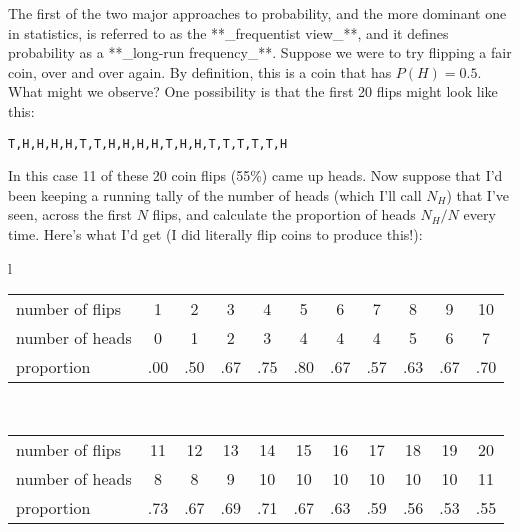 The first of the two major approaches to probability, and the more dominant one in statistics, is referred to as the **_frequentist view_**, and it defines probability as a **_long-run frequency_**. Suppose we were to try flipping a fair coin, over and over again. By definition, this is a coin that has $P(H) = 0.5$. What might we observe? One possibility is that the first 20 flips might look like this:
\begin{verbatim}
T,H,H,H,H,T,T,H,H,H,H,T,H,H,T,T,T,T,T,H
\end{verbatim}
In this case 11 of these 20 coin flips (55\%) came up heads. Now suppose that I'd been keeping a running tally of the number of heads (which I'll call $N_H$) that I've seen, across the first $N$ flips, and calculate the proportion of heads $N_H / N$ every time. Here's what I'd get (I did literally flip coins to produce this!):
\begin{center}
\begin{tabular}{l}
\begin{tabular}{l|cccccccccc}
number of flips &1 & 2 & 3 & 4 & 5 & 6 & 7 & 8 & 9 & 10 \\
number of heads & 0 & 1 & 2 & 3 & 4 & 4 & 4 & 5 & 6 & 7  \\ \hline
proportion    & .00 & .50 & .67 & .75 & .80 & .67 & .57 & .63 & .67 & .70 \\
\end{tabular} \vspace*{12pt}
\\
\begin{tabular}{l|cccccccccc}
number of flips & 11 & 12 & 13 & 14 & 15 & 16 & 17 & 18 & 19 & 20 \\
number of heads & 8  &  8 &  9 & 10 & 10 & 10 & 10 & 10 & 10 & 11 \\ \hline
proportion & .73 & .67 & .69 & .71 & .67 &  .63 & .59 & .56 & .53 & .55\\
\end{tabular}
\end{tabular}
\end{center}
